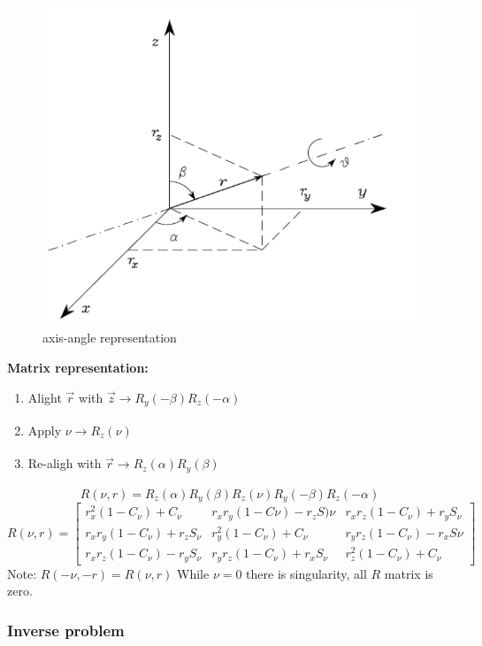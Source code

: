 \documentclass{article}
\begin{document}
\begin{figure}[h!]
\includegraphics[scale=1.5]{axisAngle.png}
\caption{axis-angle representation}
\label{fig:sr}
\end{figure}

\textbf{Matrix representation:}
\begin{enumerate}
    \item Alight $\vec{r} $ with $ \vec{z}  \xrightarrow[]{}  R_{y}(-\beta)R_{z}(-\alpha) $
    \item Apply $ \nu  \xrightarrow[]{}  R_{z}(\nu)$
    \item Re-aligh with $\vec{r} \xrightarrow[]{}  R_{z}(\alpha)R_{y}(\beta) $
\end{enumerate}
$$ R(\nu, r)  = R_{z}(\alpha)R_{y}(\beta)R_{z}(\nu)R_{y}(-\beta)R_{z}(-\alpha) $$
$$
R(\nu, r) = 
\begin{bmatrix}
r^{2}_{x}(1-C_{\nu})+C_{\nu} & r_{x}r_{y}(1-C{\nu} ) - r_{z}S){\nu} & r_{x}r_{z}(1-C_{\nu} )+r_{y}S_{\nu} \\
r_{x}r_{y}(1-C_{\nu})+r_{z}S_{\nu} & r^{2}_{y}(1-C_{\nu})+C_{\nu} & r_{y}r_{z}(1-C_{\nu})-r_{x}S{\nu} \\
r_{x}r_{z}(1-C_{\nu})-r_{y}S_{\nu} & r_{y}r_{z}(1-C_{\nu})+r_{x}S_{\nu} & r^{2}_{z}(1-C_{\nu})+C_{\nu}
\end{bmatrix}
$$
Note: $ R(-\nu, -r) = R(\nu, r)$
While $\nu=0$ there is singularity, all $R$ matrix is zero.


\subsubsection{Inverse problem}
\end{document}
